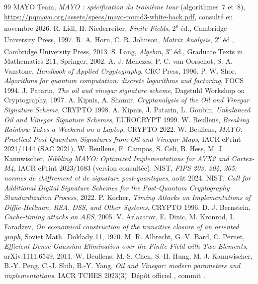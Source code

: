 \begin{thebibliography}{99}
 MAYO Team, \emph{MAYO : spécification du troisième tour} (algorithmes~7 et~8), \url{https://pqmayo.org/assets/specs/mayo-round3-white-back.pdf}, consulté en novembre 2026.
 R. Lidl, H. Niederreiter, \emph{Finite Fields}, 2\textsuperscript{e} éd., Cambridge University Press, 1997.
 R. A. Horn, C. R. Johnson, \emph{Matrix Analysis}, 2\textsuperscript{e} éd., Cambridge University Press, 2013.
 S. Lang, \emph{Algebra}, 3\textsuperscript{e} éd., Graduate Texts in Mathematics 211, Springer, 2002.
 A. J. Menezes, P. C. van Oorschot, S. A. Vanstone, \emph{Handbook of Applied Cryptography}, CRC Press, 1996.
 P. W. Shor, \emph{Algorithms for quantum computation: discrete logarithms and factoring}, FOCS 1994.
 J. Patarin, \emph{The oil and vinegar signature scheme}, Dagstuhl Workshop on Cryptography, 1997.
 A. Kipnis, A. Shamir, \emph{Cryptanalysis of the Oil and Vinegar Signature Scheme}, CRYPTO 1998.
 A. Kipnis, J. Patarin, L. Goubin, \emph{Unbalanced Oil and Vinegar Signature Schemes}, EUROCRYPT 1999.
 W. Beullens, \emph{Breaking Rainbow Takes a Weekend on a Laptop}, CRYPTO 2022.
 W. Beullens, \emph{MAYO: Practical Post-Quantum Signatures from Oil-and-Vinegar Maps}, IACR ePrint 2021/1144 (SAC 2021).
 W. Beullens, F. Campos, S. Celi, B. Hess, M. J. Kannwischer, \emph{Nibbling MAYO: Optimized Implementations for AVX2 and Cortex-M4}, IACR ePrint 2023/1683 (version consultée).
 NIST, \emph{FIPS 203, 204, 205: normes de chiffrement et de signature post-quantiques}, août 2024.
 NIST, \emph{Call for Additional Digital Signature Schemes for the Post-Quantum Cryptography Standardization Process}, 2022.
 P. Kocher, \emph{Timing Attacks on Implementations of Diffie-Hellman, RSA, DSS, and Other Systems}, CRYPTO 1996.
 D. J. Bernstein, \emph{Cache-timing attacks on AES}, 2005.
 V. Arlazarov, E. Dinic, M. Kronrod, I. Faradzev, \emph{On economical construction of the transitive closure of an oriented graph}, Soviet Math.\ Doklady 11, 1970.
 M. R. Albrecht, G. V. Bard, C. Pernet, \emph{Efficient Dense Gaussian Elimination over the Finite Field with Two Elements}, arXiv:1111.6549, 2011.
 W. Beullens, M.-S. Chen, S.-H. Hung, M. J. Kannwischer, B.-Y. Peng, C.-J. Shih, B.-Y. Yang, \emph{Oil and Vinegar: modern parameters and implementations}, IACR TCHES 2023(3).
 Dépôt officiel , commit .
\end{thebibliography}\makeatother
